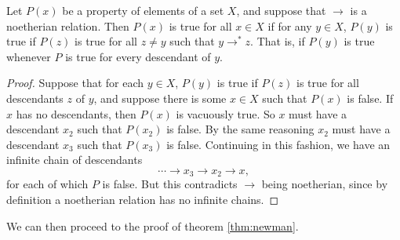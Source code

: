\documentclass[nosubthm]{lmaths}
\begin{document}
\begin{prop}
	Let $P(x)$ be a property of elements of a set $X$, and suppose that $\rightarrow$ is a noetherian relation. Then $P(x)$ is true for all $x \in X$ if for any $y \in X$, $P(y)$ is true if $P(z)$ is true for all $z \ne y$ such that $y \rightarrow^* z$. That is, if $P(y)$ is true whenever $P$ is true for every descendant of $y$.
\end{prop}
\begin{proof}
	Suppose that for each $y \in X$, $P(y)$ is true if $P(z)$ is true for all descendants $z$ of $y$, and suppose there is some $x \in X$ such that $P(x)$ is false. If $x$ has no descendants, then $P(x)$ is vacuously true. So $x$ must have a descendant $x_2$ such that $P(x_2)$ is false. By the same reasoning $x_2$ must have a descendant $x_3$ such that $P(x_3)$ is false. Continuing in this fashion, we have an infinite chain of descendants
		\[ \cdots \to x_3 \to x_2 \to x, \]
	for each of which $P$ is false. But this contradicts $\to$ being noetherian, since by definition a noetherian relation has no infinite chains.
\end{proof}

We can then proceed to the proof of theorem \ref{thm:newman}.
\end{document}
